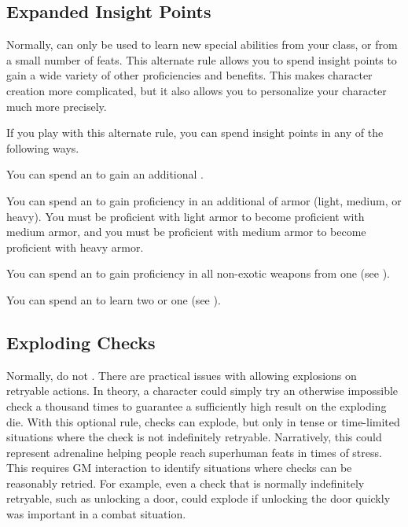   \subsection{Expanded Insight Points}
    Normally,  can only be used to learn new special abilities from your class, or from a small number of feats.
    This alternate rule allows you to spend insight points to gain a wide variety of other proficiencies and benefits.
    This makes character creation more complicated, but it also allows you to personalize your character much more precisely.

    If you play with this alternate rule, you can spend insight points in any of the following ways.
    \begin{raggeditemize}
      \item You can spend an  to gain an additional .
      \item You can spend an  to gain proficiency in an additional  of armor (light, medium, or heavy).
        You must be proficient with light armor to become proficient with medium armor, and you must be proficient with medium armor to become proficient with heavy armor.
      \item You can spend an  to gain proficiency in all non-exotic weapons from one  (see ).
      \item You can spend an  to learn two  or one  (see ).
    \end{raggeditemize}

  \subsection{Exploding Checks}
    Normally,  do not .
    There are practical issues with allowing explosions on retryable actions.
    In theory, a character could simply try an otherwise impossible check a thousand times to guarantee a sufficiently high result on the exploding die.
    With this optional rule, checks can explode, but only in tense or time-limited situations where the check is not indefinitely retryable.
    Narratively, this could represent adrenaline helping people reach superhuman feats in times of stress.
    This requires GM interaction to identify situations where checks can be reasonably retried.
    For example, even a check that is normally indefinitely retryable, such as unlocking a door, could explode if unlocking the door quickly was important in a combat situation.

